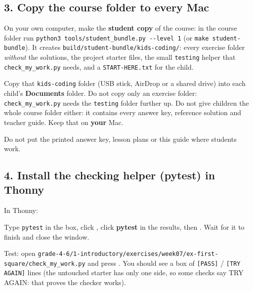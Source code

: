 \documentclass[level=1,teacher]{kidscode}
\begin{document}
\subsection{3. Copy the course folder to every Mac}
\begin{checklist}
  \item On your own computer, make the \textbf{student copy} of the course: in the course folder run
        \texttt{python3 tools/student\_bundle.py -{}-level 1} (or \texttt{make student-bundle}). It creates
        \texttt{build/\allowbreak student-bundle/\allowbreak kids-coding/}: every exercise folder \emph{without} the solutions, the
        project starter files, the small \texttt{testing} helper that \texttt{check\_my\_work.py} needs, and a
        \texttt{START-HERE.txt} for the child.
  \item Copy that \texttt{kids-coding} folder (USB stick, AirDrop or a shared drive) into each child's
        \textbf{Documents} folder. Do not copy only an exercise folder: \texttt{check\_my\_work.py}
        needs the \texttt{testing} folder further up. Do not give children the whole course folder either:
        it contains every answer key, reference solution and teacher guide. Keep that on \textbf{your} Mac.
  \item Do not put the printed answer key, lesson plans or this guide where students work.
\end{checklist}

\subsection{4. Install the checking helper (pytest) in Thonny}
\begin{checklist}
  \item In Thonny: 
  \item Type \texttt{pytest} in the box, click , click \textbf{pytest} in the results,
        then . Wait for it to finish and close the window.
  \item Test: open \texttt{grade-4-6/1-introductory/\allowbreak{}exercises/\allowbreak{}week07/\allowbreak{}ex-first-square/\allowbreak{}check\_my\_work.py} and press
        . You should see a box of \texttt{[PASS]} / \texttt{[TRY AGAIN]} lines (the untouched
        starter has only one side, so some checks say TRY AGAIN: that proves the checker works).
\end{checklist}
\end{document}
